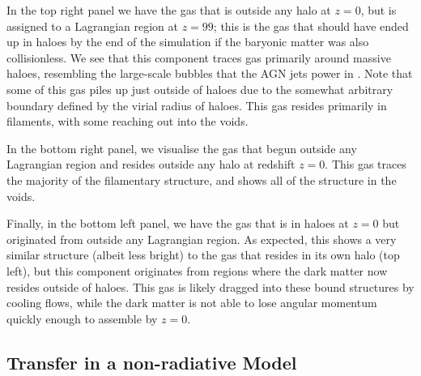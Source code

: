 In the top right panel we have the gas that is outside any halo at $z=0$, but
is assigned to a Lagrangian region at $z=99$; this is the gas that should
have ended up in haloes by the end of the simulation if the baryonic matter
was also collisionless. We see that this component traces gas primarily
around massive haloes, resembling the large-scale bubbles that the AGN jets
power in \simba{} \citep{Dave2019}. Note that some of this gas piles up just
outside of haloes due to the somewhat arbitrary boundary defined by the
virial radius of haloes. This gas resides primarily in filaments, with some
reaching out into the voids.

In the bottom right panel, we visualise the gas that begun outside any
Lagrangian region and resides outside any halo at redshift $z=0$. This gas
traces the majority of the filamentary structure, and shows all of the
structure in the voids. 

Finally, in the bottom left panel, we have the gas that is in haloes at $z=0$
but originated from outside any Lagrangian region. As expected, this shows a
very similar structure (albeit less bright) to the gas that resides in its
own halo (top left), but this component originates from regions where the
dark matter now resides outside of haloes. This gas is likely dragged into
these bound structures by cooling flows, while the dark matter
is not able to lose angular momentum quickly enough to assemble by $z=0$.




\subsection{Transfer in a non-radiative Model}

